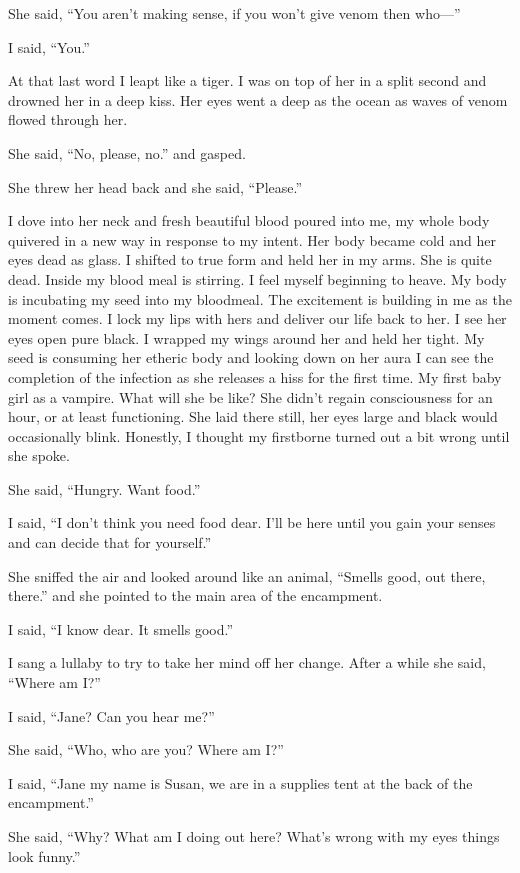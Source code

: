 She said, ``You aren't making sense, if you won't give venom then who---''

I said, ``You.''

At that last word I leapt like a tiger. I was on top of her in a split second and drowned her in a deep kiss. Her eyes went a deep as the ocean as waves of venom flowed through her. 

She said, ``No, please, no.'' and gasped. 

She threw her head back and she said, ``Please.''

I dove into her neck and fresh beautiful blood poured into me, my whole body quivered in a new way in response to my intent. Her body became cold and her eyes dead as glass. I shifted to true form and held her in my arms. She is quite dead. Inside my blood meal is stirring. I feel myself beginning to heave. My body is incubating my seed into my bloodmeal. The excitement is building in me as the moment comes. I lock my lips with hers and deliver our life back to her. I see her eyes open pure black. I wrapped my wings around her and held her tight. My seed is consuming her etheric body and looking down on her aura I can see the completion of the infection as she releases a hiss for the first time. My first baby girl as a vampire. What will she be like? She didn't regain consciousness for an hour, or at least functioning. She laid there still, her eyes large and black would occasionally blink. Honestly, I thought my firstborne turned out a bit wrong until she spoke.

She said, ``Hungry. Want food.''

I said, ``I don't think you need food dear. I'll be here until you gain your senses and can decide that for yourself.''

She sniffed the air and looked around like an animal, ``Smells good, out there, there.'' and she pointed to the main area of the encampment.

I said, ``I know dear. It smells good.''

I sang a lullaby to try to take her mind off her change. After a while she said, ``Where am I?''

I said, ``Jane? Can you hear me?''

She said, ``Who, who are you? Where am I?''

I said, ``Jane my name is Susan, we are in a supplies tent at the back of the encampment.''

She said, ``Why? What am I doing out here? What's wrong with my eyes things look funny.''

